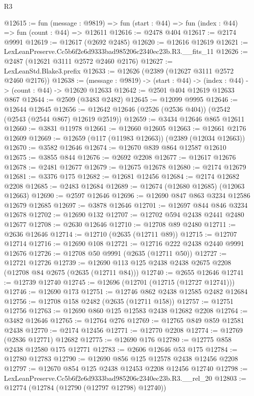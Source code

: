\begin{lexlean}{R3}
\begin{coremodule}
@12615 := fun (message : @9819) =>
  fun (start : @44) => fun (index : @44) => fun (count : @44) => @12611
@12616 := @2478 @404
@12617 := @2174 @9991
@12619 := @12617 (@2692 @2485)
@12620 := @12616 @12619
@12621 := LexLeanPreserve.Cc5b6f2e6d9333bad985206c2340ec23b.R3.__fits_11
@12626 := @2487 (@12621 @3111 @2572 @2460 @2176)
@12627 := LexLeanStd.Blake3.prefix
@12633 := @12626 (@2389 (@12627 @3111 @2572 @2460 @2176))
@12638 := (message : @9819) -> (start : @44) -> (index : @44) -> (count : @44) -> @12620 @12633
@12642 := @2501 @404 @12619 @12633 @867
@12644 := @2509 (@3483 @2482)
@12645 := @12099 @9995
@12646 := @12644 @12645
@12656 := @12642 @12646 (@2526 (@2536 @404)) (@2542 (@2543 (@2544 @867) @12619 @2519))
@12659 := @3434 @12646 @865 @12611
@12660 := @3831 @11978
@12661 := @12660 @12605
@12663 := @12661 @2176 @12609
@12669 := @12659 (@117 (@11983 @12663)) (@2389 (@12034 @12663))
@12670 := @3582 @12646
@12674 := @12670 @839 @864 @12587 @12610
@12675 := @3855 @844
@12676 := @2692 @2208
@12677 := @12617 @12676
@12678 := @2481 @12677
@12679 := @12675 @12678
@12680 := @2174 @12679
@12681 := @3376 @175
@12682 := @12681 @12456
@12684 := @2174 @12682 @2208
@12685 := @2483 @12684
@12689 := @12674 (@12680 @12685) (@12063 @12663)
@12690 := @2597 @12646
@12696 := @12690 @847 @863 @3234 @12586 @12679 @12685
@12697 := @3878 @12646
@12701 := @12697 @844 @846 @3234 @12678
@12702 := @12690 @132
@12707 := @12702 @594 @2438 @2441 @2480 @12677
@12708 := @2630 @12646
@12710 := @12708 @89 @2480
@12711 := @2636 @12646
@12714 := @12710 (@2635 (@12711 @89))
@12715 := @12707 @12714
@12716 := @12690 @108
@12721 := @12716 @222 @2438 @2440 @9991 @12676
@12726 := @12708 @50 @9991 (@2635 (@12711 @50))
@12727 := @12721 @12726
@12739 := @12690 @113 @125 @2438 @2438 @2675 @2208 (@12708 @84 @2675 (@2635 (@12711 @84)))
@12740 := @2655 @12646
@12741 := @12739 @12740
@12745 := @12696 (@12701 (@12715 (@12727 @12741)))
@12746 := @12690 @173
@12751 := @12746 @862 @2438 @12585 @2482 @12684
@12756 := @12708 @158 @2482 (@2635 (@12711 @158))
@12757 := @12751 @12756
@12763 := @12690 @860 @125 @12583 @2438 @12682 @2208
@12764 := @3482 @12646
@12765 := @12764 @276
@12769 := @12765 @849 @859 @12581 @2438
@12770 := @2174 @12456
@12771 := @12770 @2208
@12774 := @12769 (@2836 @12771) @12682
@12775 := @12690 @176
@12780 := @12775 @858 @2438 @12580 @175 @12771
@12783 := @2606 @12646 @53 @175
@12784 := @12780 @12783
@12790 := @12690 @856 @125 @12578 @2438 @12456 @2208
@12797 := @12670 @854 @125 @2438 @12453 @2208 @12456 @12740
@12798 := LexLeanPreserve.Cc5b6f2e6d9333bad985206c2340ec23b.R3.__rel_20
@12803 := @12774 (@12784 (@12790 (@12797 @12798) @12740))

\end{coremodule}
\end{lexlean}
